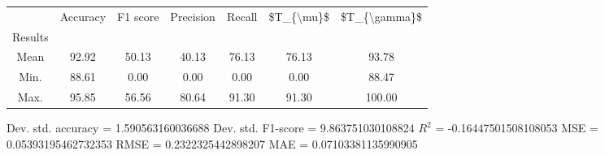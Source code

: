 \begin{tabular}{|c|c|c|c|c|c|c|}
\toprule
{} &  Accuracy &  F1 score &  Precision &  Recall &  \$T\_\{\textbackslash mu\}\$ &  \$T\_\{\textbackslash gamma\}\$ \\
Results &           &           &            &         &            &               \\
\hline
Mean    &     92.92 &     50.13 &      40.13 &   76.13 &      76.13 &         93.78 \\
Min.    &     88.61 &      0.00 &       0.00 &    0.00 &       0.00 &         88.47 \\
Max.    &     95.85 &     56.56 &      80.64 &   91.30 &      91.30 &        100.00 \\
\bottomrule
\end{tabular}

 Dev. std. accuracy = 1.590563160036688
 Dev. std. F1-score = 9.863751030108824
 $R^2$ = -0.16447501508108053
 MSE = 0.05393195462732353
 RMSE = 0.2322325442898207
 MAE = 0.07103381135990905